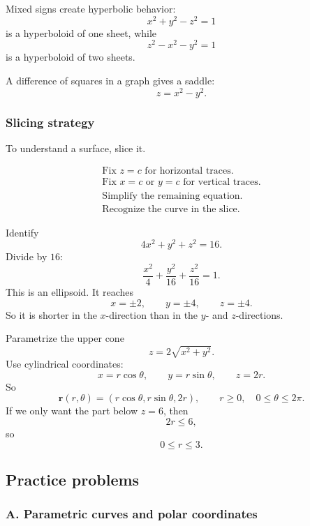 Mixed signs create hyperbolic behavior:
\[
    x^2+y^2-z^2=1
\]
is a hyperboloid of one sheet, while
\[
    z^2-x^2-y^2=1
\]
is a hyperboloid of two sheets.

A difference of squares in a graph gives a saddle:
\[
    z=x^2-y^2.
\]

\subsubsection*{Slicing strategy}

To understand a surface, slice it.

\[
\begin{array}{l}
\text{Fix }z=c\text{ for horizontal traces.}\\
\text{Fix }x=c\text{ or }y=c\text{ for vertical traces.}\\
\text{Simplify the remaining equation.}\\
\text{Recognize the curve in the slice.}
\end{array}
\]

\begin{example}
Identify
\[
    4x^2+y^2+z^2=16.
\]
Divide by \(16\):
\[
    \frac{x^2}{4}+\frac{y^2}{16}+\frac{z^2}{16}=1.
\]
This is an ellipsoid.  It reaches
\[
    x=\pm2,\qquad y=\pm4,\qquad z=\pm4.
\]
So it is shorter in the \(x\)-direction than in the \(y\)- and \(z\)-directions.
\end{example}

\begin{example}
Parametrize the upper cone
\[
    z=2\sqrt{x^2+y^2}.
\]
Use cylindrical coordinates:
\[
    x=r\cos\theta,\qquad y=r\sin\theta,\qquad z=2r.
\]
So
\[
    \mathbf r(r,\theta)
    =
    (r\cos\theta,r\sin\theta,2r),
    \qquad
    r\ge0,\quad 0\le\theta\le2\pi.
\]
If we only want the part below \(z=6\), then
\[
    2r\le6,
\]
so
\[
    0\le r\le3.
\]
\end{example}

\subsection{Practice problems}

\subsubsection*{A. Parametric curves and polar coordinates}

